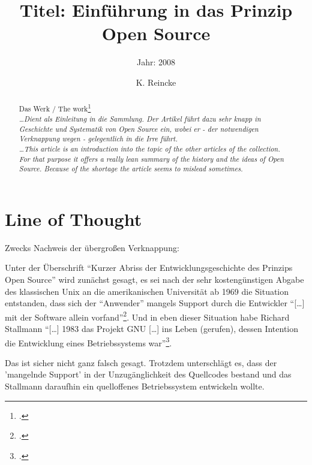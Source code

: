 \documentclass[DIV=calc,BCOR=5mm,11pt,headings=small,oneside,abstract=true, toc=bib]{scrartcl}
\begin{document}

\titlehead{Literaturexzerpt}
\subject{Autor(en): Seel und Kraft}
\title{Titel: Einführung in das Prinzip Open Source}
\subtitle{Jahr: 2008 }
\author{K. Reincke}

\maketitle

\begin{abstract}
\noindent

Das Werk / The work\footcite[][]{SeeKra2008a} \\
\noindent \itshape
\ldots Dient als Einleitung in die Sammlung. Der Artikel führt dazu sehr knapp
in Geschichte und Systematik von Open Source ein, wobei er - der notwendigen
Verknappung wegen - gelegentlich in die Irre führt. \\
\noindent
\ldots This article is an introduction into the topic of the other articles of
the collection. For that purpose it offers a really lean summary of the history
and the ideas of Open Source. Because of the shortage the article seems to
mislead sometimes.
\end{abstract}
\footnotesize
\normalsize 

\section{Line of Thought}
Zwecks Nachweis der übergroßen Verknappung:

Unter der Überschrift \enquote{Kurzer Abriss der Entwicklungsgeschichte des
Prinzips Open Source} wird zunächst gesagt, es sei nach der sehr
kostengünstigen Abgabe des klassischen Unix an die amerikanischen Universität ab
1969 die Situation entstanden, dass sich der \enquote{Anwender} mangels
Support durch die Entwickler \enquote{[\ldots] mit der Software allein
vorfand}\footcite[vgl.][12]{SeeKra2008a}. Und in eben dieser Situation
habe Richard Stallmann \enquote{[\ldots] 1983 das Projekt GNU [\ldots] ins
Leben (gerufen), dessen Intention die Entwicklung eines Betriebssystems
war}\footcite[vgl.][12]{SeeKra2008a}.

Das ist sicher nicht ganz falsch gesagt. Trotzdem unterschlägt es, dass der
'mangelnde Support' in der Unzugänglichkeit des Quellcodes bestand und das
Stallmann daraufhin ein quelloffenes Betriebssystem entwickeln wollte.
\end{document}
